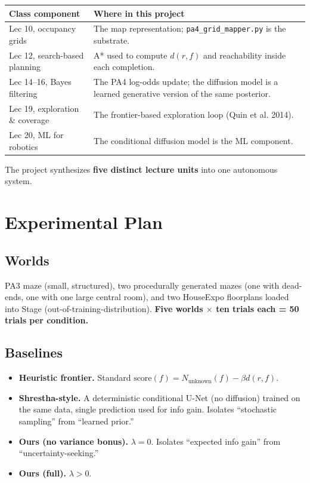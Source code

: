 \documentclass[11pt]{article}
\begin{document}
\begin{tabular}{p{} p{}}
\toprule
\textbf{Class component} & \textbf{Where in this project} \\
\midrule
Lec 10, occupancy grids & The map representation; \texttt{pa4\_grid\_mapper.py} is the substrate. \\
Lec 12, search-based planning & A* used to compute $d(r, f)$ and reachability inside each completion. \\
Lec 14--16, Bayes filtering & The PA4 log-odds update; the diffusion model is a learned generative version of the same posterior. \\
Lec 19, exploration \& coverage & The frontier-based exploration loop (Quin et al. 2014). \\
Lec 20, ML for robotics & The conditional diffusion model is the ML component. \\
\bottomrule
\end{tabular}

\medskip
\noindent The project synthesizes \textbf{five distinct lecture units} into one autonomous system.

\section{Experimental Plan}

\subsection{Worlds}
PA3 maze (small, structured), two procedurally generated mazes (one with dead-ends, one with one large central room), and two HouseExpo floorplans loaded into Stage (out-of-training-distribution). \textbf{Five worlds $\times$ ten trials each = 50 trials per condition.}

\subsection{Baselines}
\begin{itemize}[itemsep=0pt,topsep=0pt]
  \item \textbf{Heuristic frontier.} Standard $\text{score}(f) = N_\text{unknown}(f) - \beta d(r, f)$.
  \item \textbf{Shrestha-style.} A deterministic conditional U-Net (no diffusion) trained on the same data, single prediction used for info gain. Isolates ``stochastic sampling'' from ``learned prior.''
  \item \textbf{Ours (no variance bonus).} $\lambda = 0$. Isolates ``expected info gain'' from ``uncertainty-seeking.''
  \item \textbf{Ours (full).} $\lambda > 0$.
\end{itemize}
\end{document}
